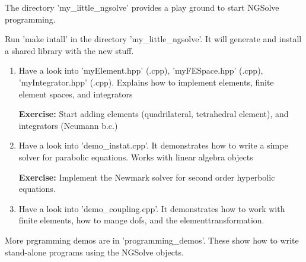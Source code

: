 \documentclass[20pt,landscape,footrule]{foils}
\begin{document}

The directory 'my\_little\_ngsolve' provides a play ground to start
NGSolve programming.  

Run 'make intall' in the directory 'my\_little\_ngsolve'. It will generate and install a shared library with the new stuff.

\begin{enumerate}
\item
Have a look into 'myElement.hpp' (.cpp), 'myFESpace.hpp' (.cpp), 'myIntegrator.hpp' (.cpp). Explains how to implement elements, finite element spaces, and integrators

{\bf Exercise:} Start adding elements (quadrilateral, tetrahedral element), and integrators (Neumann b.c.)

\item
Have a look into 'demo\_instat.cpp'. It demonstrates how to write a simpe solver for parabolic equations. Works with linear algebra objects

{\bf Exercise:} Implement the Newmark solver for second order hyperbolic equations.

\item
Have a look into 'demo\_coupling.cpp'. It demonstrates how to work with finite elements, how to mange dofs, and the elementtransformation.
\end{enumerate}

More prgramming demos are in 'programming\_demos'. These show how to write stand-alone programs using the NGSolve objects.
\end{document}
